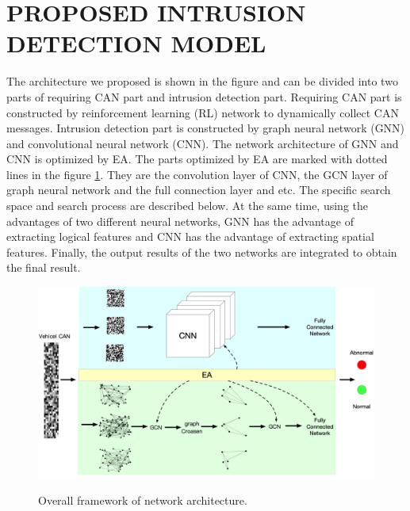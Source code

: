\documentclass[lettersize,journal]{IEEEtran}
\begin{document}
\section{PROPOSED INTRUSION DETECTION MODEL}\label{section_proposed}
The architecture we proposed is shown in the figure and can be divided into two parts of requiring CAN part and intrusion detection part. Requiring CAN part is constructed by reinforcement learning (RL) network to dynamically collect CAN messages. Intrusion detection part is constructed by graph neural network (GNN) and convolutional neural network (CNN). The network architecture of GNN and CNN is optimized by EA. The parts optimized by EA are marked with dotted lines in the figure \ref{fig_2}. They are the convolution layer of CNN, the GCN layer of graph neural network and the full connection layer and etc. The specific search space and search process are described below. At the same time, using the advantages of two different neural networks, GNN has the advantage of extracting logical features and CNN has the advantage of extracting spatial features. Finally, the output results of the two networks are integrated to obtain the final result.

\begin{figure}[!t]
\centering
{\includegraphics[width=7in]{evo-frame}%
\label{Overall framework of network architecture.}}
\hfil
\caption{Overall framework of network architecture.}
\label{fig_2}
\end{figure}
\end{document}
